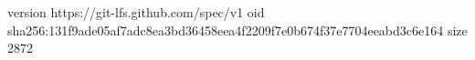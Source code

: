 version https://git-lfs.github.com/spec/v1
oid sha256:131f9ade05af7adc8ea3bd36458eea4f2209f7e0b674f37e7704eeabd3c6e164
size 2872
